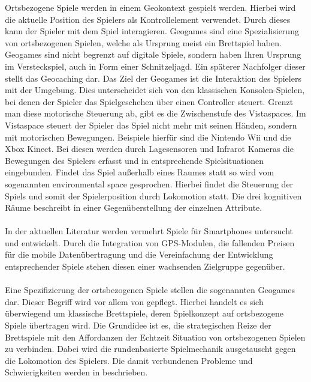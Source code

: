 Ortsbezogene Spiele werden in einem Geokontext gespielt werden. Hierbei wird die aktuelle Position des Spielers als Kontrollelement verwendet.\cite{Schlieder.2006} Durch dieses kann der Spieler mit dem Spiel interagieren.
Geogames sind eine Spezialisierung von ortsbezogenen Spielen, welche als Ursprung meist ein Brettspiel haben.
Geogames sind nicht begrenzt auf digitale Spiele, sondern haben Ihren Ursprung im Versteckspiel, auch in Form einer Schnitzeljagd. Ein späterer Nachfolger dieser stellt das Geocaching dar.\cite{Simanowski.2008}
Das Ziel der Geogames ist die Interaktion des Spielers mit der Umgebung. Dies unterscheidet sich von den klassischen Konsolen-Spielen, bei denen der Spieler das Spielgeschehen über einen Controller steuert. Grenzt man diese motorische Steuerung ab, gibt es die Zwischenstufe des Vistaspaces. Im Vistaspace steuert der Spieler das Spiel nicht mehr mit seinen Händen, sondern mit motorischen Bewegungen. Beispiele hierfür sind die Nintendo Wii und die Xbox Kinect. Bei diesen werden durch Lagesensoren und Infrarot Kameras die Bewegungen des Spielers erfasst und in entsprechende Spielsituationen eingebunden.
Findet das Spiel außerhalb eines Raumes statt so wird vom sogenannten environmental space gesprochen.
Hierbei findet die Steuerung der Spiels und somit der Spielerposition durch Lokomotion statt.\cite{Benford.2003,Kiefer.2007}
Die drei kognitiven Räume beschreibt \textcite{Berendt.1999} in einer Gegenüberstellung der einzelnen Attribute.
\\\\
In der aktuellen Literatur werden vermehrt Spiele für Smartphones untersucht und entwickelt.\cite{Rashid.2006a}
Durch die Integration von GPS-Modulen, die fallenden Preisen für die mobile Datenübertragung und die Vereinfachung der Entwicklung entsprechender Spiele stehen diesen einer wachsenden Zielgruppe gegenüber.
\\\\
Eine Spezifizierung der ortsbezogenen Spiele stellen die sogenannten Geogames dar. Dieser Begriff wird vor allem von \textcite{Schlieder.2013} gepflegt. Hierbei handelt es sich überwiegend um klassische Brettspiele, deren Spielkonzept auf ortsbezogene Spiele übertragen wird. Die Grundidee ist es, die strategischen Reize der Brettspiele mit den Affordanzen der Echtzeit Situation von ortsbezogenen Spielen zu verbinden. Dabei wird die rundenbasierte Spielmechanik ausgetauscht gegen die Lokomotion des Spielers. Die damit verbundenen Probleme und Schwierigkeiten werden in \textcite{Schlieder.2006} beschrieben.


